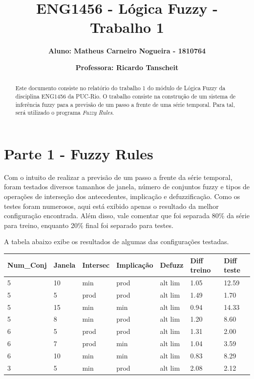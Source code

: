 \documentclass[12pt]{article}
\title{\textbf{ENG1456 - Lógica Fuzzy - Trabalho 1}}
\author{\textbf{Aluno: Matheus Carneiro Nogueira - 1810764}}
\affil{}
\author{\textbf{Professora: Ricardo Tanscheit}}
\affil{}
\date{}
\begin{document}
	\maketitle
	\tableofcontents
	
	
	\begin{abstract}
		Este documento consiste no relatório do trabalho 1 do módulo de Lógica Fuzzy da disciplina ENG1456 da PUC-Rio. O trabalho consiste na construção de um sistema de inferência fuzzy para a previsão de um passo a frente de uma série temporal. Para tal, será utilizado o programa \textit{Fuzzy Rules}.
	\end{abstract}
	
	
\section{Parte 1 - Fuzzy Rules}

Com o intuito de realizar a previsão de um passo a frente da série temporal, foram testados diversos tamanhos de janela, número de conjuntos fuzzy e tipos de operações de interseção dos antecedentes, implicação e defuzzificação. Como os testes foram numerosos, aqui está exibido apenas o resultado da melhor configuração encontrada. Além disso, vale comentar que foi separada 80\% da série para treino, enquanto 20\% final foi separado para testes.

A tabela abaixo exibe os resultados de algumas das configurações testadas.

\begin{table}[H]
	\centering
	\begin{tabular}{|l|l|l|l|l|l|l|}
		\hline
		Num\_Conj & Janela & Intersec & Implicação & Defuzz  & Diff treino & Diff teste \\ \hline
		5         & 10     & min      & prod       & alt lim & 1.05        & 12.59      \\ \hline
		5         & 5      & prod     & prod       & alt lim & 1.49        & 1.70       \\ \hline
		5         & 15     & min      & min        & alt lim & 0.94        & 14.33      \\ \hline
		5         & 8      & min      & prod       & alt lim & 1.20        & 8.60       \\ \hline
		6         & 5      & prod     & prod       & alt lim & 1.31        & 2.00       \\ \hline
		6         & 7      & prod     & min        & alt lim & 1.04        & 3.59       \\ \hline
		6         & 10     & min      & min        & alt lim & 0.83        & 8.29       \\ \hline
		3         & 5      & min      & prod       & alt lim & 2.08        & 2.12       \\ \hline
	\end{tabular}
\end{table}
\end{document}
